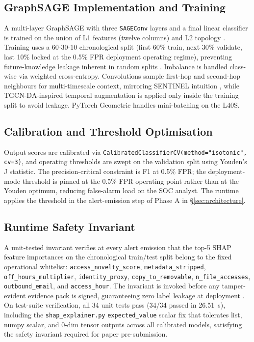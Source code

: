 \subsection{GraphSAGE Implementation and Training}

A multi-layer GraphSAGE with three \texttt{SAGEConv} layers and a final linear classifier is trained on the union of L1 features (twelve columns) and L2 topology \citep{xiao2022robust}. Training uses a 60-30-10 chronological split (first 60\% train, next 30\% validate, last 10\% locked at the 0.5\% FPR deployment operating regime), preventing future-knowledge leakage inherent in random splits \citep{gao2023dtgi}. Imbalance is handled class-wise via weighted cross-entropy. Convolutions sample first-hop and second-hop neighbours for multi-timescale context, mirroring SENTINEL intuition \citep{xiao2024sentinel}, while TGCN-DA-inspired temporal augmentation \citep{li2023tgcnda} is applied only inside the training split to avoid leakage. PyTorch Geometric handles mini-batching on the L40S.

\subsection{Calibration and Threshold Optimisation}

Output scores are calibrated via \texttt{CalibratedClassifierCV\allowbreak(method="isotonic", \allowbreak cv=3)}, and operating thresholds are swept on the validation split using Youden's J statistic. The precision-critical constraint is F1 at 0.5\% FPR; the deployment-mode threshold is pinned at the 0.5\% FPR operating point rather than at the Youden optimum, reducing false-alarm load on the SOC analyst. The runtime applies the threshold in the alert-emission step of Phase A in \S\ref{sec:architecture}.

\subsection{Runtime Safety Invariant}

A unit-tested invariant verifies at every alert emission that the top-5 SHAP feature importances on the chronological train/test split belong to the fixed operational whitelist: \texttt{access\_\allowbreak novelty\_\allowbreak score}, \texttt{metadata\_\allowbreak stripped}, \allowbreak \texttt{off\_\allowbreak hours\_\allowbreak multiplier}, \allowbreak \texttt{identity\_\allowbreak proxy}, \allowbreak \texttt{copy\_\allowbreak to\_\allowbreak removable}, \allowbreak \texttt{n\_\allowbreak file\_\allowbreak accesses}, \allowbreak \texttt{outbound\_\allowbreak email}, and \texttt{access\_\allowbreak hour}. The invariant is invoked before any tamper-evident evidence pack is signed, guaranteeing zero label leakage at deployment \citep{li2021threat, mavroeidis2018framework}. On test-suite verification, all 34 unit tests pass (34/34 passed in 26.51~s), including the \texttt{shap\_explainer.py} \texttt{expected\_value} scalar fix that tolerates list, numpy scalar, and 0-dim tensor outputs across all calibrated models, satisfying the safety invariant required for paper pre-submission.
